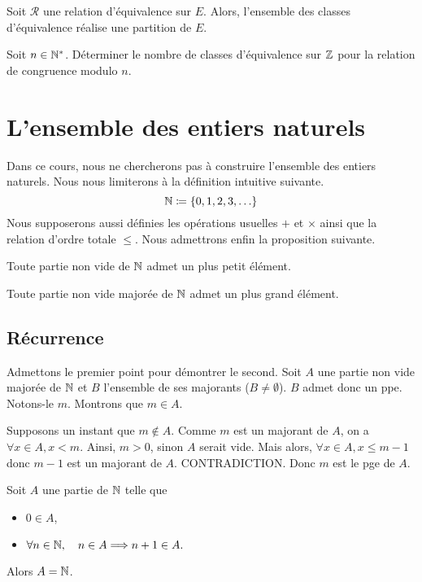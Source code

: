 \documentclass{magnoliaold}
\begin{document}
\begin{proposition}[utile=-3]
Soit $\mathcal{R}$ une relation d'équivalence sur $E$. Alors, l'ensemble des
classes d'équivalence réalise une partition de $E$.
\end{proposition}

\begin{exoUnique}
\exo Soit $n\in{\mathbb{N}^*}$. Déterminer le nombre de classes d'équivalence sur $\mathbb{Z}$
  pour la relation de congruence modulo $n$.
\end{exoUnique}
  
  

\section{L'ensemble des entiers naturels}

Dans ce cours, nous ne chercherons pas à construire l'ensemble des entiers naturels.
Nous nous limiterons à la définition intuitive suivante.
\[\mathbb{N}\coloneqq\left\{0,1,2,3,\ldots\right\}\]
Nous supposerons aussi définies les opérations usuelles $+$ et $\times$ ainsi que la
relation d'ordre totale $\leq$. Nous admettrons enfin la proposition suivante.

\begin{proposition}[utile=-3]
Toute partie non vide de $\mathbb{N}$ admet un plus petit élément.
\end{proposition}
  
\begin{proposition}[utile=-3]
Toute partie non vide majorée de $\mathbb{N}$ admet un plus grand élément.
\end{proposition}

\subsection{Récurrence}


\begin{preuve}
Admettons le premier point pour démontrer le second. Soit $A$ une partie non vide majorée de $\mathbb{N}$ et $B$ l'ensemble de ses majorants ($B\neq \emptyset$). $B$ admet donc un ppe. Notons-le $m$. Montrons que $m\in A$.

Supposons un instant que $m\notin A$. Comme $m$ est un majorant de $A$, on a $\forall x \in A, x<m$. Ainsi, $m>0$, sinon $A$ serait vide. Mais alors, $\forall x \in A, x\leq m-1$ donc $m-1$ est un majorant de $A$. CONTRADICTION. Donc $m$ est le pge de $A$.
\end{preuve}

\begin{proposition}[utile=-3, nom={Principe de récurrence}]
Soit $A$ une partie de $\mathbb{N}$ telle que
\begin{itemize}
\item $0\in A$,
\item $\forall n\in\mathbb{N},\quad n\in A \Longrightarrow n+1 \in A.$
\end{itemize}
Alors $A=\mathbb{N}$.
\end{proposition}
\end{document}

